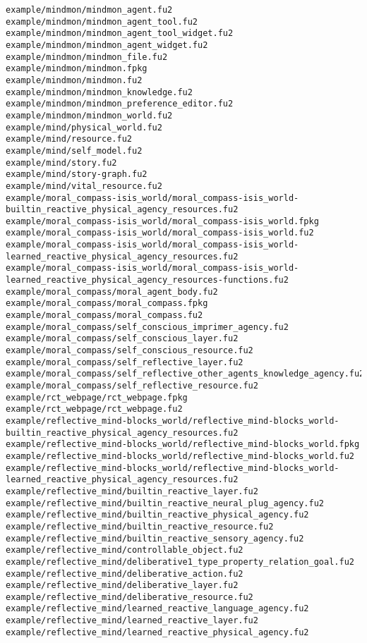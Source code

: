 \begin{lstlisting}
example/mindmon/mindmon_agent.fu2
example/mindmon/mindmon_agent_tool.fu2
example/mindmon/mindmon_agent_tool_widget.fu2
example/mindmon/mindmon_agent_widget.fu2
example/mindmon/mindmon_file.fu2
example/mindmon/mindmon.fpkg
example/mindmon/mindmon.fu2
example/mindmon/mindmon_knowledge.fu2
example/mindmon/mindmon_preference_editor.fu2
example/mindmon/mindmon_world.fu2
example/mind/physical_world.fu2
example/mind/resource.fu2
example/mind/self_model.fu2
example/mind/story.fu2
example/mind/story-graph.fu2
example/mind/vital_resource.fu2
example/moral_compass-isis_world/moral_compass-isis_world-builtin_reactive_physical_agency_resources.fu2
example/moral_compass-isis_world/moral_compass-isis_world.fpkg
example/moral_compass-isis_world/moral_compass-isis_world.fu2
example/moral_compass-isis_world/moral_compass-isis_world-learned_reactive_physical_agency_resources.fu2
example/moral_compass-isis_world/moral_compass-isis_world-learned_reactive_physical_agency_resources-functions.fu2
example/moral_compass/moral_agent_body.fu2
example/moral_compass/moral_compass.fpkg
example/moral_compass/moral_compass.fu2
example/moral_compass/self_conscious_imprimer_agency.fu2
example/moral_compass/self_conscious_layer.fu2
example/moral_compass/self_conscious_resource.fu2
example/moral_compass/self_reflective_layer.fu2
example/moral_compass/self_reflective_other_agents_knowledge_agency.fu2
example/moral_compass/self_reflective_resource.fu2
example/rct_webpage/rct_webpage.fpkg
example/rct_webpage/rct_webpage.fu2
example/reflective_mind-blocks_world/reflective_mind-blocks_world-builtin_reactive_physical_agency_resources.fu2
example/reflective_mind-blocks_world/reflective_mind-blocks_world.fpkg
example/reflective_mind-blocks_world/reflective_mind-blocks_world.fu2
example/reflective_mind-blocks_world/reflective_mind-blocks_world-learned_reactive_physical_agency_resources.fu2
example/reflective_mind/builtin_reactive_layer.fu2
example/reflective_mind/builtin_reactive_neural_plug_agency.fu2
example/reflective_mind/builtin_reactive_physical_agency.fu2
example/reflective_mind/builtin_reactive_resource.fu2
example/reflective_mind/builtin_reactive_sensory_agency.fu2
example/reflective_mind/controllable_object.fu2
example/reflective_mind/deliberative1_type_property_relation_goal.fu2
example/reflective_mind/deliberative_action.fu2
example/reflective_mind/deliberative_layer.fu2
example/reflective_mind/deliberative_resource.fu2
example/reflective_mind/learned_reactive_language_agency.fu2
example/reflective_mind/learned_reactive_layer.fu2
example/reflective_mind/learned_reactive_physical_agency.fu2

\end{lstlisting}
